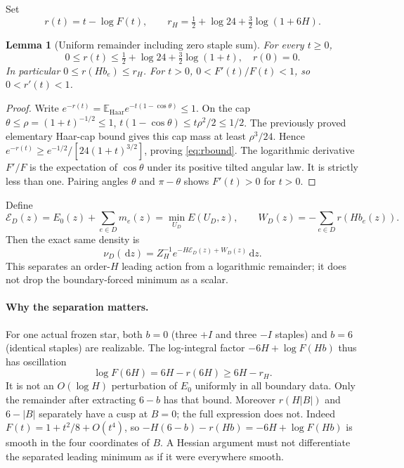 \documentclass[11pt]{article}
\newtheorem{lemma}[theorem]{Lemma}
\theoremstyle{definition}
\theoremstyle{remark}
\newcommand{\E}{\mathbb E}
\newcommand{\dd}{\,\mathrm d}
\begin{document}
Set
\begin{equation}
 r(t)=t-\log F(t),\qquad
 r_H=\tfrac12+\log24+\tfrac32\log(1+6H).
 \label{eq:r}
\end{equation}
\begin{lemma}[Uniform remainder including zero staple sum]\label{lem:r}
For every $t\ge0$,
\begin{equation}
 0\le r(t)\le\tfrac12+\log24+\tfrac32\log(1+t),\quad r(0)=0.
 \label{eq:rbound}
\end{equation}
In particular $0\le r(Hb_e)\le r_H$. For $t>0$,
$0<F'(t)/F(t)<1$, so $0<r'(t)<1$.
\end{lemma}
\begin{proof}
Write
$e^{-r(t)}=\E_{\mathrm{Haar}}e^{-t(1-\cos\theta)}\le1$.
On the cap $\theta\le\rho=(1+t)^{-1/2}\le1$,
$t(1-\cos\theta)\le t\rho^2/2\le1/2$.
The previously proved elementary Haar-cap bound gives this cap mass
at least $\rho^3/24$. Hence
$e^{-r(t)}\ge e^{-1/2}/[24(1+t)^{3/2}]$, proving \eqref{eq:rbound}.
The logarithmic derivative $F'/F$ is the expectation of $\cos\theta$
under its positive tilted angular law. It is strictly less than one.
Pairing angles $\theta$ and $\pi-\theta$ shows $F'(t)>0$ for $t>0$.
\end{proof}
Define
\begin{equation}
 \mathcal E_D(z)=E_0(z)+\sum_{e\in D}m_e(z)
               =\min_{U_D}E(U_D,z),\qquad
 W_D(z)=-\sum_{e\in D}r(Hb_e(z)).
 \label{eq:effective}
\end{equation}
Then the exact same density is
\begin{equation}
 \nu_D(\dd z)=Z_H^{-1}e^{-H\mathcal E_D(z)+W_D(z)}\dd z.
 \label{eq:split}
\end{equation}
This separates an order-$H$ leading action from a logarithmic remainder;
it does not drop the boundary-forced minimum as a scalar.

\paragraph{Why the separation matters.}
For one actual frozen star, both $b=0$ (three $+I$ and three $-I$
staples) and $b=6$ (identical staples) are realizable. The log-integral
factor $-6H+\log F(Hb)$ thus has oscillation
\[
 \log F(6H)=6H-r(6H)\ge6H-r_H.
\]
It is not an $O(\log H)$ perturbation of $E_0$ uniformly in all boundary
data. Only the remainder after extracting $6-b$ has that bound.
Moreover $r(H|B|)$ and $6-|B|$ separately have a cusp at $B=0$;
the full expression does not. Indeed
$F(t)=1+t^2/8+O(t^4)$, so
$-H(6-b)-r(Hb)=-6H+\log F(Hb)$ is smooth in the four coordinates of
$B$. A Hessian argument must not differentiate the separated leading
minimum as if it were everywhere smooth.
\end{document}
